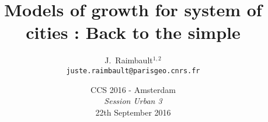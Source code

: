 \documentclass[english,11pt]{beamer}
\begin{document}
\title{Models of growth for system of cities : Back to the simple}

\author{J.~Raimbault$^{1,2}$\\
\texttt{juste.raimbault@parisgeo.cnrs.fr}
}




\date{CCS 2016 - Amsterdam\\\smallskip
\textit{Session Urban 3}\\\smallskip 22th September 2016
}

\frame{\maketitle}






\end{document}
